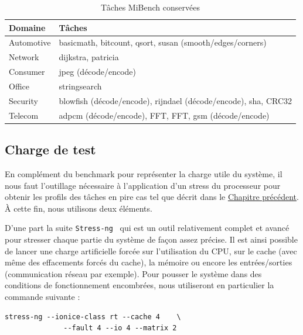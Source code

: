 \documentclass[french, a4paper, 11pt, twoside, pdftex]{StyleThese}
\begin{document}
    \begin{table}[ht]
    	\renewcommand{\arraystretch}{1.3}
    	\caption{Tâches MiBench conservées}
    	\label{tab:MiBench_final}
    	\centering
    	\begin{tabular}{@{}ll@{}}
    		\toprule
    		Domaine		& Tâches					\\
    		\midrule
    		Automotive  & basicmath, bitcount, qsort, susan (smooth/edges/corners)	\\
    		Network     & dijkstra, patricia                                        \\
    		Consumer    & jpeg (décode/encode)		                            \\
    		Office      & stringsearch                                              \\
    		Security    & blowfish (décode/encode), rijndael (décode/encode), sha, CRC32		\\
    		Telecom     & adpcm (décode/encode), FFT, FFT\up{-1}, gsm (décode/encode)   \\
    		\bottomrule
    	\end{tabular}
    \end{table}

	\subsection{Charge de test}
	En complément du benchmark pour représenter la charge utile du système, il nous faut l'outillage nécessaire à l'application d'un stress du processeur pour obtenir les profils des tâches en pire cas tel que décrit dans le \hyperref[chap:4_ProtocolExpe]{Chapitre précédent}. À cette fin, nous utilisons deux éléments.
	
	D'une part la suite \texttt{Stress-ng}~\cite{king_stress-ng_2019} qui est un outil relativement complet et avancé pour stresser chaque partie du système de façon assez précise. Il est ainsi possible de lancer une charge artificielle forcée sur l'utilisation du CPU, sur le cache (avec même des effacements forcés du cache), la mémoire ou encore les entrées/sorties (communication réseau par exemple). Pour pousser le système dans des conditions de fonctionnement encombrées, nous utiliseront en particulier la commande suivante : 
		\begin{lstlisting}[numbers=none]
	stress-ng --ionice-class rt --cache 4    \
	          --fault 4 --io 4 --matrix 2\end{lstlisting}
	
\end{document}
